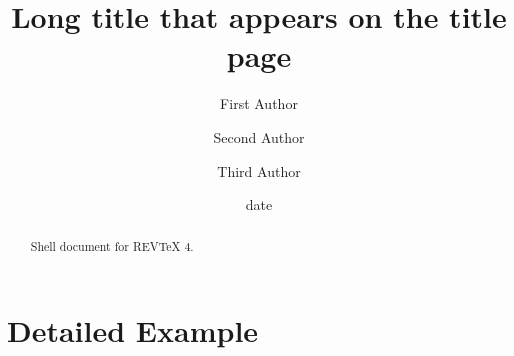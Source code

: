 \documentclass[aps,preprint]{revtex4}%
\begin{document}
\title[Short title for running header]{Long title that appears on the title page}
\author{First Author}
\author{Second Author}
\author{Third Author}

\begin{abstract}
Shell document for REV\TeX{} 4.

\end{abstract}
\date[Date text]{date}




\maketitle
\tableofcontents


\section{Detailed Example}%
\end{document}
